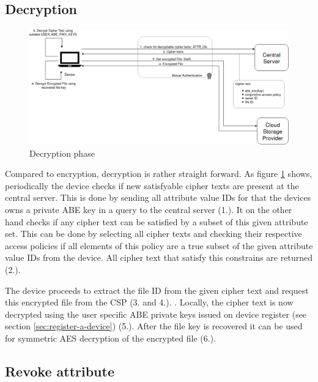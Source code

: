 \subsection{Decryption}

\begin{figure}[!t]
\centering
    \includegraphics[width=1.0\linewidth]{img/decryption.png}
    \caption{Decryption phase}
    \label{fig:tfdacmacs-decryption}
\end{figure}

Compared to encryption, decryption is rather straight forward. As figure \ref{fig:tfdacmacs-decryption} shows, periodically the device checks if new satisfyable cipher texts are present at the central server. This is done by sending all attribute value IDs for that the devices owns a private ABE key in a query to the central server (1.). It on the other hand checks if any cipher text can be satisfied by a subset of this given attribute set. This can be done by selecting all cipher texts and checking their respective access policies if all elements of this policy are a true subset of the given attribute value IDs from the device. All cipher text that satisfy this constrains are returned (2.).

The device proceeds to extract the file ID from the given cipher text and request this encrypted file from the CSP (3. and 4.). . Locally, the cipher text is now decrypted using the user specific ABE private keys issued on device register (see section \ref{sec:register-a-device}) (5.). After the file key is recovered it can be used for symmetric  AES decryption of the encrypted file (6.). 

\subsection{Revoke attribute}

